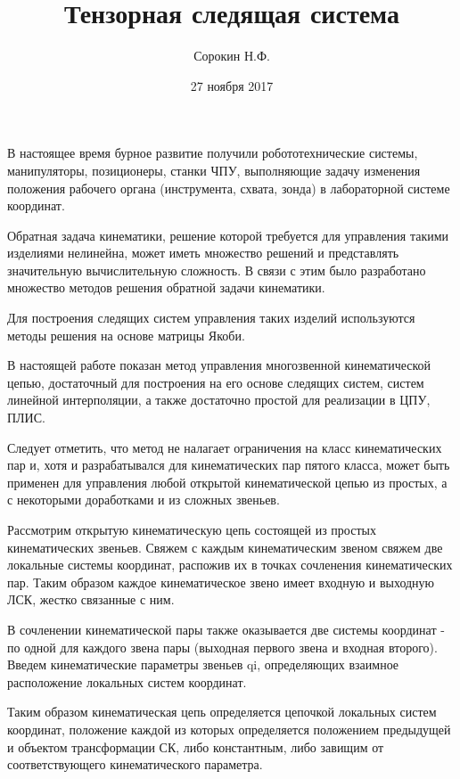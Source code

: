 \documentclass{article}
\begin{document}
\date{27 ноября 2017}

\title{Тензорная следящая система}
\author{Сорокин Н.Ф.}

\maketitle
\newpage

В настоящее время бурное развитие получили робототехнические системы, манипуляторы, позиционеры, станки ЧПУ, выполняющие задачу изменения положения рабочего органа (инструмента, схвата, зонда) в лабораторной системе координат.

Обратная задача кинематики, решение которой требуется для управления такими изделиями нелинейна, может иметь множество решений и представлять значительную вычислительную сложность. В связи с этим было разработано множество методов решения обратной задачи кинематики.

Для построения следящих систем управления таких изделий используются методы решения на основе матрицы Якоби.


В настоящей работе показан метод управления многозвенной кинематической цепью, достаточный для построения на его основе следящих систем, систем линейной интерполяции, а также достаточно простой для реализации в ЦПУ, ПЛИС. 

Следует отметить, что метод не налагает ограничения на класс кинематических пар и, хотя и разрабатывался для кинематических пар пятого класса, может быть применен для управления любой открытой кинематической цепью из простых, а с некоторыми доработками и из сложных звеньев.




Рассмотрим открытую кинематическую цепь состоящей из простых кинематических звеньев. Свяжем с каждым кинематическим звеном свяжем две локальные системы координат, распожив их в точках сочленения кинематических пар. Таким образом каждое кинематическое звено имеет входную и выходную ЛСК, жестко связанные с ним.

В сочленении кинематической пары также оказывается две системы координат - по одной для каждого звена пары (выходная первого звена и входная второго). Введем кинематические параметры звеньев qi, определяющих взаимное расположение локальных систем координат.

Таким образом кинематическая цепь определяется цепочкой локальных систем координат, положение каждой из которых определяется положением предыдущей и объектом трансформации СК, либо константным, либо завищим от соответствующего кинематического параметра.
\end{document}
